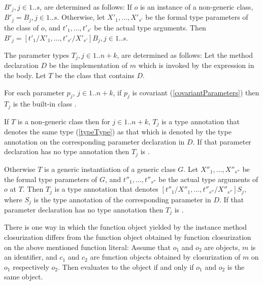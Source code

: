 \documentclass[makeidx]{article}
\begin{document}
{\LMHash{}%
$B'_j, j \in 1 .. s$, are determined as follows:
If $o$ is an instance of a non-generic class, $B'_j = B_j, j \in 1 .. s$.
Otherwise, let $X'_1, \ldots, X'_{s'}$ be
the formal type parameters of the class of $o$,
and $t'_1, \ldots, t'_{s'}$ be the actual type arguments.
Then $B'_j = [t'_1/X'_1, \ldots, t'_{s'}/X'_{s'}]B_j, j \in 1 .. s$.


\LMHash{}%
The parameter types $T_j, j \in 1 .. n+k$, are determined as follows:
Let the method declaration $D$ be the implementation of $m$
which is invoked by the expression in the body.
Let $T$ be the class that contains $D$.


\LMHash{}%
For each parameter $p_j$, $j \in 1 .. n+k$, if $p_j$ is covariant
(\ref{covariantParameters})
then $T_j$ is the built-in class .


\LMHash{}%
If $T$ is a non-generic class then for $j \in 1 .. n+k$,
$T_j$ is a type annotation that denotes the same type
(\ref{typeType})
as that which is denoted by the type annotation on
the corresponding parameter declaration in $D$.
If that parameter declaration has no type annotation then $T_j$ is \DYNAMIC.

\LMHash{}%
Otherwise $T$ is a generic instantiation of a generic class $G$.
Let $X''_1, \ldots, X''_{s''}$ be the formal type parameters of $G$,
and $t''_1, \ldots, t''_{s''}$ be the actual type arguments of $o$ at $T$.
Then $T_j$ is a type annotation that denotes
$[t''_1/X''_1, \ldots, t''_{s''}/X''_{s''}]S_j$,
where $S_j$ is the type annotation of the corresponding parameter in $D$.
If that parameter declaration has no type annotation then $T_j$ is \DYNAMIC.

\LMHash{}%
There is one way in which
the function object yielded by the instance method closurization differs from
the function object obtained by function closurization on
the above mentioned function literal:
Assume that $o_1$ and $o_2$ are objects, $m$ is an identifier,
and $c_1$ and $c_2$ are function objects
obtained by closurization of $m$ on $o_1$ respectively $o_2$.
Then  evaluates to the \TRUE{} object
if and only if $o_1$ and $o_2$ is the same object.

}
\end{document}

